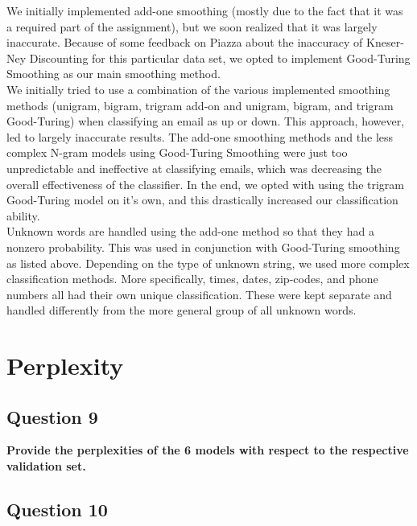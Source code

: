 \documentclass{article} %
\begin{document}
We initially implemented add-one smoothing (mostly due to the fact that it was a required part of the assignment), but we soon realized that it was largely inaccurate. Because of some feedback on Piazza about the inaccuracy of Kneser-Ney Discounting for this particular data set, we opted to implement Good-Turing Smoothing as our main smoothing method.\\

We initially tried to use a combination of the various implemented smoothing methods (unigram, bigram, trigram add-on and unigram, bigram, and trigram Good-Turing) when classifying an email as up or down. This approach, however, led to largely inaccurate results. The add-one smoothing methods and the less complex N-gram models using Good-Turing Smoothing were just too unpredictable and ineffective at classifying emails, which was decreasing the overall effectiveness of the classifier. In the end, we opted with using the trigram Good-Turing model on it's own, and this drastically increased our classification ability.\\

Unknown words are handled using the add-one method so that they had a nonzero probability. This was used in conjunction with Good-Turing smoothing as listed above. Depending on the type of unknown string, we used more complex classification methods. More specifically, times, dates, zip-codes, and phone numbers all had their own unique classification. These were kept separate and handled differently from the more general group of all unknown words.


\lipsum[2] %

\section{Perplexity}

\subsection*{Question 9}

\textbf{Provide the perplexities of the 6 models with respect to the respective validation set.}
\\


\lipsum[2] %

\subsection*{Question 10}
\end{document}
